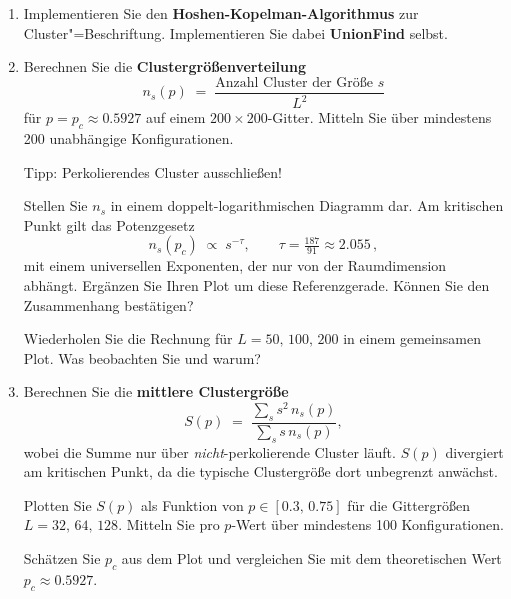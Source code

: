 \documentclass[12pt, a4paper]{article}
\begin{document}
\begin{enumerate}

\item Implementieren Sie den \textbf{Hoshen-Kopelman-Algorithmus} zur Cluster"=Beschriftung. Implementieren Sie dabei \textbf{UnionFind} selbst.

\item Berechnen Sie die \textbf{Clustergrößenverteilung}
\[
  n_s(p) \;=\; \frac{\text{Anzahl Cluster der Größe }s}{L^2}
\]
für $p = p_c \approx 0.5927$ auf einem $200\times 200$-Gitter.
Mitteln Sie über mindestens 200 unabhängige Konfigurationen.

Tipp: Perkolierendes Cluster ausschließen!

Stellen Sie $n_s$ in einem doppelt-logarithmischen Diagramm dar.
Am kritischen Punkt gilt das Potenzgesetz
\[
  n_s(p_c) \;\propto\; s^{-\tau}, \qquad \tau = \tfrac{187}{91} \approx 2.055\,,
\]
mit einem universellen Exponenten, der nur von der Raumdimension abhängt.
Ergänzen Sie Ihren Plot um diese Referenzgerade.
Können Sie den Zusammenhang bestätigen?

Wiederholen Sie die Rechnung für $L = 50,\,100,\,200$ in einem gemeinsamen Plot.
Was beobachten Sie und warum?

\item Berechnen Sie die \textbf{mittlere Clustergröße}
\[
  S(p) \;=\; \frac{\displaystyle\sum_s s^2\, n_s(p)}{\displaystyle\sum_s s\, n_s(p)},
\]
wobei die Summe nur über \emph{nicht}-perkolierende Cluster läuft.
$S(p)$ divergiert am kritischen Punkt, da die typische Clustergröße dort unbegrenzt
anwächst.

Plotten Sie $S(p)$ als Funktion von $p \in [0.3,\,0.75]$
für die Gittergrößen $L = 32,\,64,\,128$.
Mitteln Sie pro $p$-Wert über mindestens 100 Konfigurationen.

Schätzen Sie $p_c$ aus dem Plot und vergleichen Sie mit dem theoretischen Wert
$p_c \approx 0.5927$.




\end{enumerate}
\end{document}
